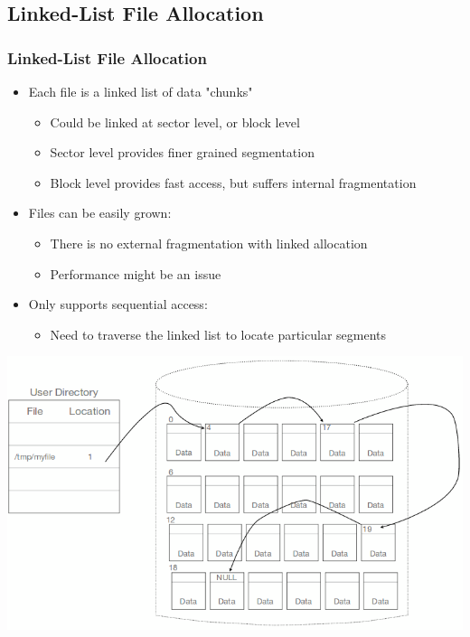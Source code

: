 \documentclass{beamer}
\begin{document}
\subsection{Linked-List File Allocation}
\begin{frame}
\frametitle{Linked-List File Allocation}
\begin{itemize}
\item Each file is a linked list of data "chunks"
\begin{itemize}
\item Could be linked at sector level, or block level
\item Sector level provides finer grained segmentation
\item Block level provides fast access, but suffers internal fragmentation
\end{itemize}
\item Files can be easily grown:
\begin{itemize}
\item There is no external fragmentation with linked allocation
\item Performance might be an issue
\end{itemize}
\item Only supports sequential access:
\begin{itemize}
\item Need to traverse the linked list to locate particular segments	
\end{itemize}
\end{itemize}
\includegraphics[scale=0.2]{linked.png}
\end{frame}
\end{document}
